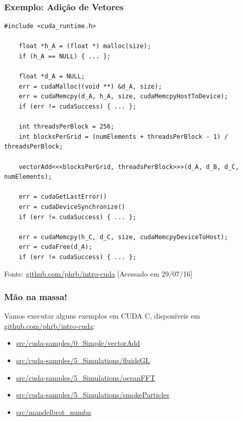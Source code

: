 \documentclass[10pt, compress]{beamer}
\begin{document}
\begin{frame}[fragile]
    \frametitle{Exemplo: Adição de Vetores}
    \begin{lstlisting}[basicstyle=\ttfamily\scriptsize]
    #include <cuda_runtime.h>

    float *h_A = (float *) malloc(size);
    if (h_A == NULL) { ... };

    float *d_A = NULL;
    err = cudaMalloc((void **) &d_A, size);
    err = cudaMemcpy(d_A, h_A, size, cudaMemcpyHostToDevice);
    if (err != cudaSuccess) { ... };

    int threadsPerBlock = 256;
    int blocksPerGrid = (numElements + threadsPerBlock - 1) / threadsPerBlock;

    vectorAdd<<<blocksPerGrid, threadsPerBlock>>>(d_A, d_B, d_C, numElements);

    err = cudaGetLastError()
    err = cudaDeviceSynchronize()
    if (err != cudaSuccess) { ... };

    err = cudaMemcpy(h_C, d_C, size, cudaMemcpyDeviceToHost);
    err = cudaFree(d_A);
    if (err != cudaSuccess) { ... };
    \end{lstlisting}

    \vfill

    \begin{center}
        \tiny{Fonte: \url{github.com/phrb/intro-cuda} [Acessado em 29/07/16]}
    \end{center}
\end{frame}

\begin{frame}
    \frametitle{Mão na massa!}
    Vamos executar alguns exemplos em CUDA C,
    disponíveis em \url{github.com/phrb/intro-cuda}:
    \begin{itemize}
        \item \url{src/cuda-samples/0_Simple/vectorAdd}
        \item \url{src/cuda-samples/5_Simulations/fluidsGL}
        \item \url{src/cuda-samples/5_Simulations/oceanFFT}
        \item \url{src/cuda-samples/5_Simulations/smokeParticles}
        \item \url{src/mandelbrot_numba}
    \end{itemize}
\end{frame}
\end{document}
